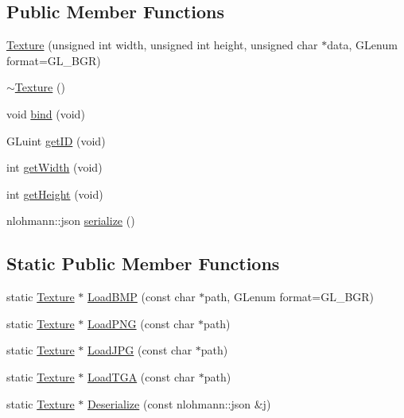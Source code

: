 \subsection*{Public Member Functions}
\begin{DoxyCompactItemize}
\item 
\mbox{\hyperlink{class_beer_engine_1_1_graphics_1_1_texture_a1cb1dc8dea72805bec4fcbb150417c7f}{Texture}} (unsigned int width, unsigned int height, unsigned char $\ast$data, G\+Lenum format=G\+L\+\_\+\+B\+GR)
\item 
\mbox{\hyperlink{class_beer_engine_1_1_graphics_1_1_texture_aed43390619f1c87396b0155b5b093435}{$\sim$\+Texture}} ()
\item 
void \mbox{\hyperlink{class_beer_engine_1_1_graphics_1_1_texture_ae3d406ddddec85670df1e98d776353bf}{bind}} (void)
\item 
G\+Luint \mbox{\hyperlink{class_beer_engine_1_1_graphics_1_1_texture_abfa392e4a23ad309225526af572f9751}{get\+ID}} (void)
\item 
int \mbox{\hyperlink{class_beer_engine_1_1_graphics_1_1_texture_a1586064c91fdcf29b539a2fedd8f63ca}{get\+Width}} (void)
\item 
int \mbox{\hyperlink{class_beer_engine_1_1_graphics_1_1_texture_a961146ab713ba8fd18f8db95a97145ca}{get\+Height}} (void)
\item 
nlohmann\+::json \mbox{\hyperlink{class_beer_engine_1_1_graphics_1_1_texture_acb81c7ded6c7be42b0e901dd57dc8785}{serialize}} ()
\end{DoxyCompactItemize}
\subsection*{Static Public Member Functions}
\begin{DoxyCompactItemize}
\item 
static \mbox{\hyperlink{class_beer_engine_1_1_graphics_1_1_texture}{Texture}} $\ast$ \mbox{\hyperlink{class_beer_engine_1_1_graphics_1_1_texture_aad31fe0bd31ac46cf56c11e5a152a07f}{Load\+B\+MP}} (const char $\ast$path, G\+Lenum format=G\+L\+\_\+\+B\+GR)
\item 
static \mbox{\hyperlink{class_beer_engine_1_1_graphics_1_1_texture}{Texture}} $\ast$ \mbox{\hyperlink{class_beer_engine_1_1_graphics_1_1_texture_ae49b1e363625c007c5553e1ace04cace}{Load\+P\+NG}} (const char $\ast$path)
\item 
static \mbox{\hyperlink{class_beer_engine_1_1_graphics_1_1_texture}{Texture}} $\ast$ \mbox{\hyperlink{class_beer_engine_1_1_graphics_1_1_texture_ad59a1155532f41e9a46666def60218df}{Load\+J\+PG}} (const char $\ast$path)
\item 
static \mbox{\hyperlink{class_beer_engine_1_1_graphics_1_1_texture}{Texture}} $\ast$ \mbox{\hyperlink{class_beer_engine_1_1_graphics_1_1_texture_a57210a6e3dfc7cedc814c76753ba387e}{Load\+T\+GA}} (const char $\ast$path)
\item 
static \mbox{\hyperlink{class_beer_engine_1_1_graphics_1_1_texture}{Texture}} $\ast$ \mbox{\hyperlink{class_beer_engine_1_1_graphics_1_1_texture_aa7a835edb0417a09057481ba44de53df}{Deserialize}} (const nlohmann\+::json \&j)
\end{DoxyCompactItemize}


